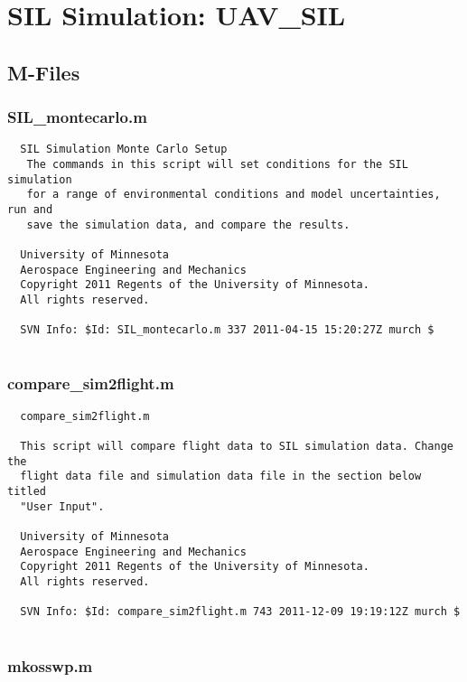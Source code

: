\documentclass[12pt]{article}
\begin{document}
\section{SIL Simulation: UAV\_SIL}
\subsection{M-Files}
\subsubsection{SIL\_montecarlo.m}
\begin{verbatim}
  SIL Simulation Monte Carlo Setup
   The commands in this script will set conditions for the SIL simulation
   for a range of environmental conditions and model uncertainties, run and
   save the simulation data, and compare the results.
 
  University of Minnesota 
  Aerospace Engineering and Mechanics 
  Copyright 2011 Regents of the University of Minnesota. 
  All rights reserved.
 
  SVN Info: $Id: SIL_montecarlo.m 337 2011-04-15 15:20:27Z murch $


\end{verbatim}

\subsubsection{compare\_sim2flight.m}
\begin{verbatim}
  compare_sim2flight.m
 
  This script will compare flight data to SIL simulation data. Change the
  flight data file and simulation data file in the section below titled
  "User Input".
 
  University of Minnesota
  Aerospace Engineering and Mechanics
  Copyright 2011 Regents of the University of Minnesota.
  All rights reserved.
 
  SVN Info: $Id: compare_sim2flight.m 743 2011-12-09 19:19:12Z murch $


\end{verbatim}

\subsubsection{mkosswp.m}
\begin{verbatim}


\end{verbatim}
\end{document}
